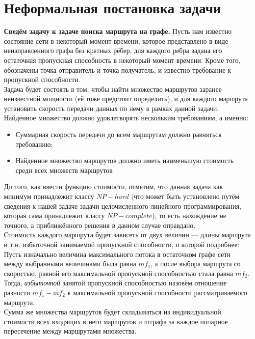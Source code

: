 \documentclass[a4paper]{article}
\begin{document}
\newpage
\section{Неформальная постановка задачи}
\textbf{Сведём задачу к задаче поиска маршрута на графе.} 
Пусть нам известно состояние сети в некоторый момент времени, которое представлено в виде ненаправленного графа без кратных рёбер, для каждого ребра задана его остаточная пропускная способность в некоторый момент времени. Кроме того, обозначены точка-отправитель и точка-получатель, и известно требование к пропускной способности. \\
Задача будет состоять в том, чтобы найти множество маршрутов заранее неизвестной мощности (её тоже предстоит определить), и для каждого маршрута установить скорость передачи данных по нему в рамках данной задачи. 
Найденное множество должно удовлетворять нескольким требованиям, а именно: \\
\begin{itemize}
\item Суммарная скорость передачи до всем маршрутам должно равняться требованию;
\item Найденное множество маршрутов должно иметь наименьшую стоимость среди всех множеств маршрутов  
\end{itemize}
До того, как ввести функцию стоимости, отметим, что данная задача как минимум принадлежит классу $NP-hard$ (что может быть установлено путём сведения к нашей задаче задачи целочисленного линейного программирования, которая сама принадлежит классу $NP-complete$), то есть нахождение не точного, а приближённого решения в данном случае оправдано.\\
Стоимость каждого маршрута будет зависеть от двух величин --- длины маршрута и т.н. избыточной занимаемой пропускной способности, о которой подробнее:\\
Пусть изначально величина максимального потока в остаточном графе сети между выбранными величинами была равна $mf_1$, а после выбора маршрута со скоростью, равной его максимальной пропускной способностью стала равна $mf_2$. Тогда, \textit{избыточной} занятой пропускной способностью назовём отношение разности $mf_1 - mf_2$ к максимальной пропускной способности рассматриваемого маршрута.\\
Сумма же множества маршрутов будет складываться из индивидуальной стоимости всех входящих в него маршрутов и штрафа за каждое попарное пересечение между маршрутами множества.

\newpage
\end{document}
